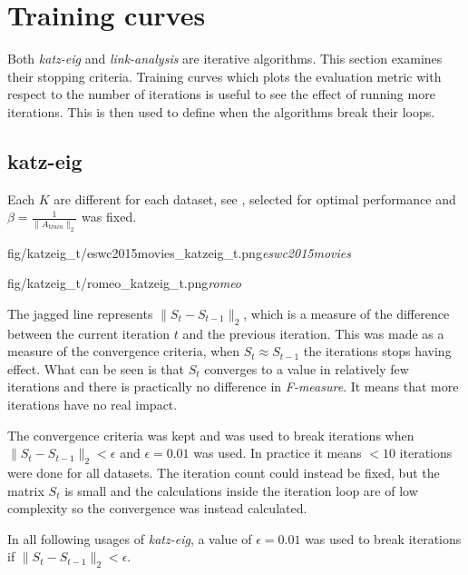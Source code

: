 
\section{Training curves}\label{sec:graphs:training_curves}

Both \textit{katz-eig} and \textit{link-analysis} are iterative algorithms. This section examines their stopping criteria.  Training curves which plots the evaluation metric with respect to the number of iterations is useful to see the effect of running more iterations. This is then used to define when the algorithms break their loops.


\subsection{katz-eig}\label{sec:training:katz}

Each $K$ are different for each dataset, see , selected for optimal performance and $\beta = \frac{1}{\|A_{train}\|_2}$ was fixed.

\FloatBarrier

{fig/katzeig_t/eswc2015movies_katzeig_t.png}{\textit{eswc2015movies}}

{fig/katzeig_t/romeo_katzeig_t.png}{\textit{romeo}}

\FloatBarrier

The jagged line represents $\|S_t - S_{t - 1}\|_2$, which is a measure of the difference between the current iteration $t$ and the previous iteration. This was made as a measure of the convergence criteria, when $S_t \approx S_{t - 1}$ the iterations stops having effect. What can be seen is that $S_t$ converges to a value in relatively few iterations and there is practically no difference in \textit{F-measure}. It means that more iterations have no real impact.

The convergence criteria was kept and was used to break iterations when $\|S_t - S_{t - 1}\|_2 < \epsilon$ and $\epsilon = 0.01$ was used. In practice it means $< 10$ iterations were done for all datasets. The iteration count could instead be fixed, but the matrix $S_t$ is small and the calculations inside the iteration loop are of low complexity so the convergence was instead calculated.

In all following usages of \textit{katz-eig}, a value of $\epsilon = 0.01$ was used to break iterations if $\|S_t - S_{t - 1}\|_2 < \epsilon$.


